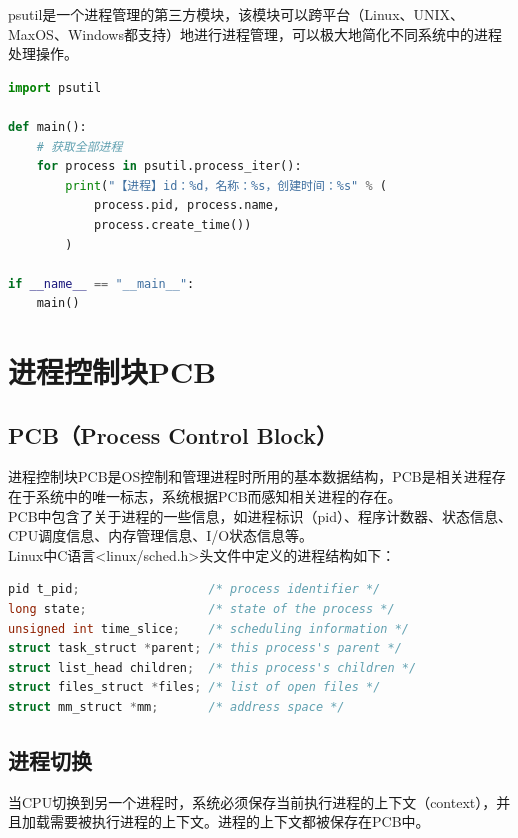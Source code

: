 psutil是一个进程管理的第三方模块，该模块可以跨平台（Linux、UNIX、MaxOS、Windows都支持）地进行进程管理，可以极大地简化不同系统中的进程处理操作。 \\

\begin{lstlisting}[language=Python]
import psutil

def main():
	# 获取全部进程
	for process in psutil.process_iter():
		print("【进程】id：%d，名称：%s，创建时间：%s" % (
			process.pid, process.name,
			process.create_time())
		)

if __name__ == "__main__":
	main()
\end{lstlisting}

\newpage

\section{进程控制块PCB}

\subsection{PCB（Process Control Block）}

进程控制块PCB是OS控制和管理进程时所用的基本数据结构，PCB是相关进程存在于系统中的唯一标志，系统根据PCB而感知相关进程的存在。 \\

PCB中包含了关于进程的一些信息，如进程标识（pid）、程序计数器、状态信息、CPU调度信息、内存管理信息、I/O状态信息等。 \\

Linux中C语言<linux/sched.h>头文件中定义的进程结构如下： \\

\begin{lstlisting}[language=C]
pid t_pid;					/* process identifier */
long state;					/* state of the process */
unsigned int time_slice;	/* scheduling information */
struct task_struct *parent;	/* this process's parent */
struct list_head children;	/* this process's children */
struct files_struct *files;	/* list of open files */
struct mm_struct *mm;		/* address space */
\end{lstlisting}

\subsection{进程切换}

当CPU切换到另一个进程时，系统必须保存当前执行进程的上下文（context），并且加载需要被执行进程的上下文。进程的上下文都被保存在PCB中。

